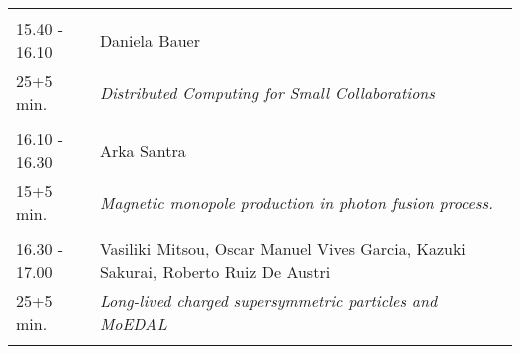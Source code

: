 \begin{longtable}{p{3cm}p{13cm}}
 & \\ 
15.40 - 16.10 & Daniela Bauer\\ 
25+5 min. & {\it Distributed Computing for Small Collaborations}\\ 
 & \\ 
16.10 - 16.30 & Arka Santra\\ 
15+5 min. & {\it Magnetic monopole production in photon fusion process.}\\ 
 & \\ 
16.30 - 17.00 & Vasiliki Mitsou, Oscar Manuel Vives Garcia, Kazuki Sakurai, Roberto Ruiz De Austri\\ 
25+5 min. & {\it Long-lived charged supersymmetric particles and MoEDAL}\\ 
 & \\ 
\end{longtable}

